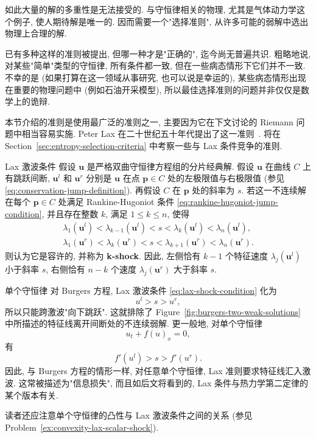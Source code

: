 如此大量的解的多重性是无法接受的. 与守恒律相关的物理, 尤其是气体动力学这个例子, 使人期待解是唯一的. 因而需要一个"选择准则", 从许多可能的弱解中选出物理上合理的解.

已有多种这样的准则被提出, 但哪一种才是"正确的", 迄今尚无普遍共识. 粗略地说, 对某些"简单"类型的守恒律, 所有条件都一致, 但在一些病态情形下它们并不一致. 不幸的是 (如果打算在这一领域从事研究, 也可以说是幸运的), 某些病态情形出现在重要的物理问题中 (例如石油开采模型), 所以最佳选择准则的问题并非仅仅是数学上的诡辩.

本节介绍的准则是使用最广泛的准则之一, 主要因为它在下文讨论的 Riemann 问题中相当容易实施. Peter Lax 在二十世纪五十年代提出了这一准则~\cite{La}. 将在 Section~\ref{sec:entropy-selection-criteria} 中考察一些与 Lax 条件竞争的准则.

\begin{Definition}{Lax 激波条件}
\label{def:lax-shock-condition}
假设 $\bm{u}$ 是严格双曲守恒律方程组的分片经典解. 假设 $\bm{u}$ 在曲线 $C$ 上有跳跃间断, $\bm{u}^l$ 和 $\bm{u}^r$ 分别是 $\bm{u}$ 在点 $\bm{p}\in C$ 处的左极限值与右极限值 (参见 \eqref{eq:conservation-jump-definition}). 再假设 $C$ 在 $\bm{p}$ 处的斜率为 $s$. 若这一不连续解在每个 $\bm{p}\in C$ 处满足 Rankine-Hugoniot 条件 \eqref{eq:rankine-hugoniot-jump-condition}, 并且存在整数 $k$, 满足 $1\leq k\leq n$, 使得
\begin{equation}\label{eq:lax-shock-condition}
\begin{gathered}
\lambda_1(\bm{u}^l)<\lambda_{k-1}(\bm{u}^l)<s<\lambda_k(\bm{u}^l)<\lambda_n(\bm{u}^l),\\
\lambda_1(\bm{u}^r)<\lambda_k(\bm{u}^r)<s<\lambda_{k+1}(\bm{u}^r)<\lambda_n(\bm{u}^r).
\end{gathered}
\end{equation}
则认为它是容许的, 并称为 \textbf{k-shock}. 因此, 左侧恰有 $k-1$ 个特征速度 $\lambda_j(\bm{u}^l)$ 小于斜率 $s$, 右侧恰有 $n-k$ 个速度 $\lambda_j(\bm{u}^r)$ 大于斜率 $s$.
\end{Definition}

\begin{Example}{单个守恒律}
\label{ex:scalar-lax-shock}
对 Burgers 方程, Lax 激波条件 \eqref{eq:lax-shock-condition} 化为
\begin{equation}\label{eq:burgers-lax-condition}
u^l>s>u^r,
\end{equation}
所以只能跨激波"向下跳跃". 这就排除了 Figure~\ref{fig:burgers-two-weak-solutions} 中所描述的特征线离开间断处的不连续弱解. 更一般地, 对单个守恒律
\[
u_t+f(u)_x=0,
\]
有
\begin{equation}\label{eq:scalar-lax-condition}
f'(u^l)>s>f'(u^r).
\end{equation}
因此, 与 Burgers 方程的情形一样, 对任意单个守恒律, Lax 准则要求特征线汇入激波. 这常被描述为"信息损失", 而且如后文将看到的, Lax 条件与热力学第二定律的某个版本有关.

读者还应注意单个守恒律的凸性与 Lax 激波条件之间的关系 (参见 Problem~\ref{ex:convexity-lax-scalar-shock}).
\end{Example}

